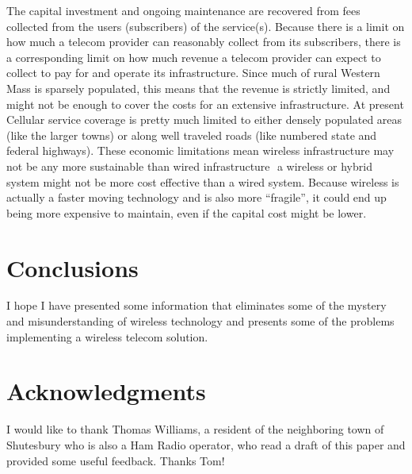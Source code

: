 \documentclass[12pt]{article}
\begin{document}
The capital investment and ongoing maintenance are recovered from fees
collected from the users (subscribers) of the service(s). Because there is a
limit on how much a telecom provider can reasonably collect from its
subscribers, there is a corresponding limit on how much revenue a telecom
provider can expect to collect to pay for and operate its infrastructure.
Since much of rural Western Mass is sparsely populated, this means that the
revenue is strictly limited, and might not be enough to cover the costs for an
extensive infrastructure. At present Cellular service coverage is pretty much
limited to either densely populated areas (like the larger towns) or along
well traveled roads (like numbered state and federal highways). These economic
limitations mean wireless infrastructure may not be any more sustainable than
wired infrastructure ­ a wireless or hybrid system might not be more cost
effective than a wired system. Because wireless is actually a faster moving
technology and is also more ``fragile'', it could end up being more expensive
to maintain, even if the capital cost might be lower.
    

\section{Conclusions}

I hope I have presented some information that eliminates some of the mystery 
and misunderstanding of wireless technology and presents some of the problems 
implementing a wireless telecom solution.


\appendix
\clearpage
{}


\clearpage
{}
\section*{Acknowledgments}

I would like to thank Thomas Williams, a resident of the neighboring town of
Shutesbury who is also a Ham Radio operator, who read a draft of this paper
and provided some useful feedback. Thanks Tom!
\end{document}

